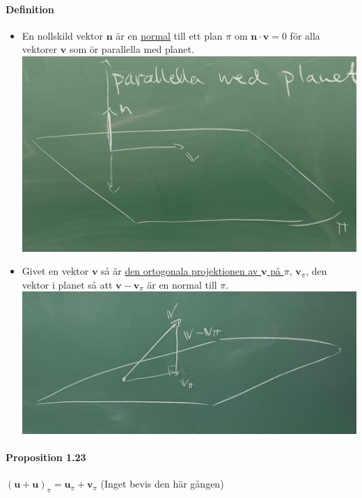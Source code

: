     \paragraph{Definition} \begin{itemize}
        \item En nollskild vektor $\bm{n}$ är en \underline{normal} till ett plan $\pi$ om $\bm{n}\cdot \bm{v} = 0$ för alla vektorer $\bm{v}$ som ör parallella med planet.\\
            \includegraphics[scale=0.15]{imgs/22-01-20-img06.jpg}
        \item Givet en vektor $\bm{v}$ så är \underline{den ortogonala projektionen av $\bm{v}$ på $\pi$}, $\bm{v}_{\pi}$, den vektor i planet så att $\bm{v}-\bm{v}_{\pi}$ är en normal till $\pi$.\\
            \includegraphics[scale=0.15]{imgs/22-01-20-img07.jpg}
    \end{itemize}
    
    \paragraph{Proposition 1.23} $(\bm{u} + \bm{u})_{\pi}=\bm{u}_{\pi} + \bm{v}_{\pi}$ (Inget bevis den här gången)

